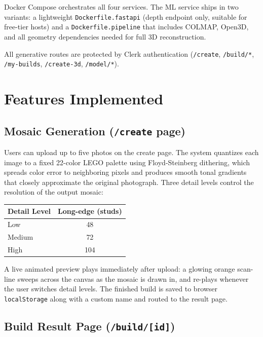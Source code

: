 \documentclass[12pt]{article}
\begin{document}
Docker Compose orchestrates all four services. The ML service ships in two
variants: a lightweight \texttt{Dockerfile.fastapi} (depth endpoint only,
suitable for free-tier hosts) and a \texttt{Dockerfile.pipeline} that includes
COLMAP, Open3D, and all geometry dependencies needed for full 3D reconstruction.

All generative routes are protected by Clerk authentication
(\texttt{/create}, \texttt{/build/*}, \texttt{/my-builds},
\texttt{/create-3d}, \texttt{/model/*}).

\section{Features Implemented}

\subsection{Mosaic Generation (\texttt{/create} page)}

Users can upload up to five photos on the create page. The system quantizes
each image to a fixed 22-color LEGO palette using Floyd-Steinberg dithering,
which spreads color error to neighboring pixels and produces smooth tonal
gradients that closely approximate the original photograph. Three detail levels
control the resolution of the output mosaic:

\begin{center}
\begin{tabular}{lc}
\toprule
\textbf{Detail Level} & \textbf{Long-edge (studs)} \\
\midrule
Low    & 48 \\
Medium & 72 \\
High   & 104 \\
\bottomrule
\end{tabular}
\end{center}

A live animated preview plays immediately after upload: a glowing orange
scan-line sweeps across the canvas as the mosaic is drawn in, and re-plays
whenever the user switches detail levels. The finished build is saved to
browser \texttt{localStorage} along with a custom name and routed to the
result page.

\subsection{Build Result Page (\texttt{/build/[id]})}
\end{document}
